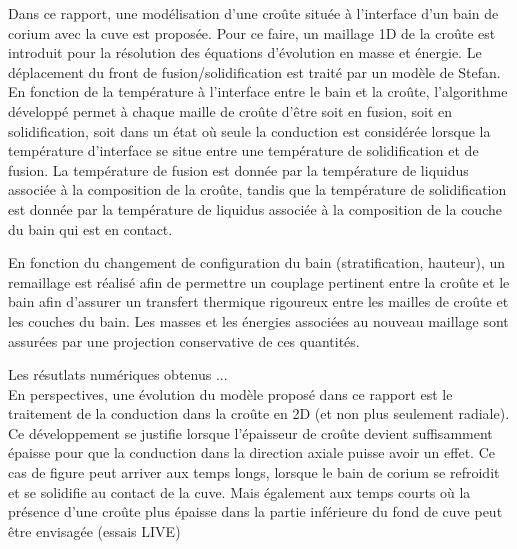 Dans ce rapport, une modélisation d'une croûte située à l'interface d'un bain de corium avec la cuve est proposée. Pour ce faire, un maillage 1D de la croûte est introduit pour la résolution des équations d'évolution en masse et énergie. Le déplacement du front de fusion/solidification est traité par un modèle de Stefan. En fonction de la température à l'interface entre le bain et la croûte, l'algorithme développé permet à chaque maille de croûte d'être soit en fusion, soit en solidification, soit dans un état où seule la conduction est considérée lorsque la température d'interface se situe entre une température de solidification et de fusion. La température de fusion est donnée par la température de liquidus associée à la composition de la croûte, tandis que la température de solidification est donnée par la température de liquidus associée à la composition de la couche du bain qui est en contact. 

En fonction du changement de configuration du bain (stratification, hauteur), un remaillage est réalisé afin de permettre un couplage pertinent entre la croûte et le bain afin d'assurer un transfert thermique rigoureux entre les mailles de croûte et les couches du bain. Les masses et les énergies associées au nouveau maillage sont assurées par une projection conservative de ces quantités.

Les résutlats numériques obtenus ...\\

En perspectives, une évolution du modèle proposé dans ce rapport est le traitement de la conduction dans la croûte en 2D (et non plus seulement radiale). Ce développement se justifie lorsque l'épaisseur de croûte devient suffisamment épaisse pour que la conduction dans la direction axiale puisse avoir un effet. Ce cas de figure peut arriver aux temps longs, lorsque le bain de corium se refroidit et se solidifie au contact de la cuve. Mais également aux temps courts où la présence d'une croûte plus épaisse dans la partie inférieure du fond de cuve peut être envisagée (essais LIVE) 
